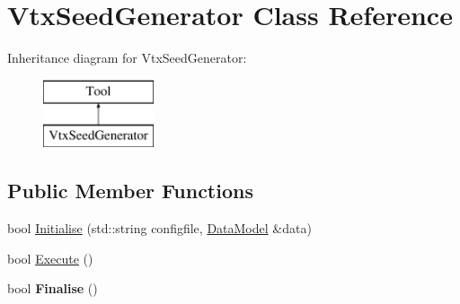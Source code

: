 \hypertarget{classVtxSeedGenerator}{\section{Vtx\-Seed\-Generator Class Reference}
\label{classVtxSeedGenerator}
}
Inheritance diagram for Vtx\-Seed\-Generator\-:\begin{figure}[H]
\begin{center}
\leavevmode
\includegraphics[height=2.000000cm]{classVtxSeedGenerator}
\end{center}
\end{figure}
\subsection*{Public Member Functions}
\begin{DoxyCompactItemize}
\item 
bool \hyperlink{classVtxSeedGenerator_aa07a4e52d01bb171fc07b12027369dab}{Initialise} (std\-::string configfile, \hyperlink{classDataModel}{Data\-Model} \&data)
\item 
bool \hyperlink{classVtxSeedGenerator_a72ef5546d469ec83191fa13737cfa4ed}{Execute} ()
\item 
\hypertarget{classVtxSeedGenerator_a4460b85304ae3a2bc8dbb81c155daac5}{bool {\bfseries Finalise} ()}\label{classVtxSeedGenerator_a4460b85304ae3a2bc8dbb81c155daac5}

\end{DoxyCompactItemize}


